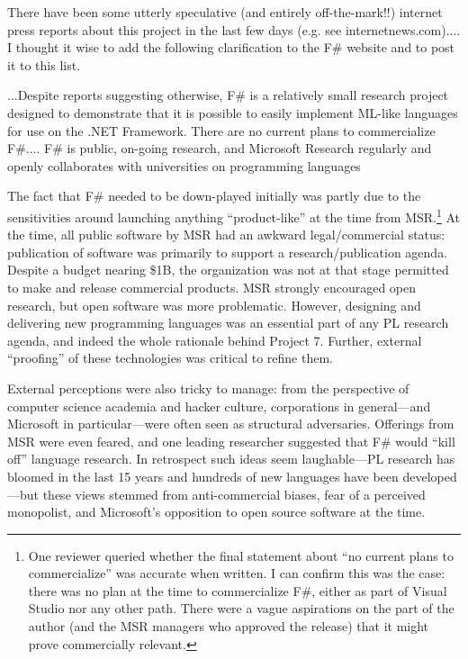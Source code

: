 \documentclass[acmsmall]{acmart}\settopmatter{}
\begin{document}
\begin{verbquote}
There have been some utterly speculative (and entirely off-the-mark!!) internet press reports about this project in the last few days (e.g. see internetnews.com).... I thought it wise to add the following clarification to the F# website and to post it to this list.

...Despite reports suggesting otherwise, F# is a relatively small research project designed to demonstrate that it is possible to easily implement ML-like languages for use on the .NET Framework.  There are no current plans to commercialize F#.... F# is public, on-going research, and Microsoft Research regularly and openly collaborates with universities on programming languages
\end{verbquote}

The fact that F\# needed to be down-played initially was partly due to the sensitivities around launching anything “product-like” at the
time from MSR.\footnote{One reviewer queried whether the final statement about ``no current plans to commercialize'' was accurate
when written.  I can confirm this was the case: there was no plan at the time to commercialize F\#, either as part of Visual Studio nor any
other path. There were a vague aspirations on the part of the author (and the MSR managers who approved the release) that it might
prove commercially relevant.} At the time, all public software by MSR had an awkward legal/commercial status: publication of software
was primarily to support a research/publication agenda. Despite a budget nearing \$1B, the organization was not at that stage permitted
to make and release commercial products.  MSR strongly encouraged open research, but open software was more problematic. However,
designing and delivering new programming languages was an essential part of any PL research agenda, and indeed the whole rationale
behind Project 7.  Further, external “proofing” of these technologies was critical to refine them. 

External perceptions were also tricky to manage: from the perspective of computer science academia and hacker culture, corporations
in general---and Microsoft in particular---were often seen as structural adversaries. Offerings from MSR were even feared, and one
leading researcher suggested that F\# would “kill off” language research.  In retrospect such ideas seem laughable---PL research has
bloomed in the last 15 years and hundreds of new languages have been developed---but these views stemmed from anti-commercial
biases, fear of a perceived monopolist, and Microsoft’s opposition to open source software at the time. 
\end{document}
